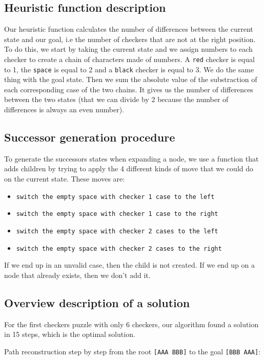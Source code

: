 \documentclass{article}
\begin{document}
\subsection{Heuristic function description}
Our heuristic function calculates the number of differences between the current
state and our goal, i.e the number of checkers that are not at the right
position.
To do this, we start by taking the current state and we assign numbers to each
checker to create a chain of characters made of numbers. A \texttt{red} checker
is equal to 1, the \texttt{space} is equal to 2 and a \texttt{black} checker is
equal to 3. We do the same thing with the goal state. Then we sum the absolute
value of the substraction of each corresponding case of the two chains. It gives
us the number of differences between the two states (that we can divide by 2
because the number of differences is always an even number).

\subsection{Successor generation procedure}
To generate the successors states when expanding a node, we use a function that
adds children by trying to apply the 4 different kinds of move that we could do
on the current state. These moves are:
\begin{itemize}
  \item \texttt{switch the empty space with checker 1 case to the left}
  \item \texttt{switch the empty space with checker 1 case to the right}
  \item \texttt{switch the empty space with checker 2 cases to the left}
  \item \texttt{switch the empty space with checker 2 cases to the right}
\end{itemize}


If we end up in an unvalid case, then the child is not created.
If we end up on a node that already exists, then we don't add it.

\subsection{Overview description of a solution}
For the first checkers puzzle with only 6 checkers, our algorithm found a
solution in 15 steps, which is the optimal solution.

Path reconstruction step by step from the root \texttt{[AAA BBB]} to the goal
\texttt{[BBB AAA]}:
\end{document}
